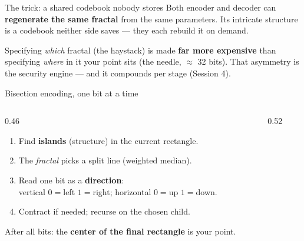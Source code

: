 \documentclass[aspectratio=169,11pt]{beamer}
\begin{document}
\begin{frame}{The trick: a shared codebook nobody stores}
  Both encoder and decoder can \textbf{regenerate the same fractal} from the same
  parameters. Its intricate structure is a codebook neither side saves --- they
  each rebuild it on demand.
  \vspace{6pt}
  \begin{keyidea}
    Specifying \emph{which} fractal (the haystack) is made \textbf{far more
    expensive} than specifying \emph{where} in it your point sits (the needle,
    $\approx$ 32 bits). That asymmetry is the security engine --- and it
    compounds per stage (Session 4).
  \end{keyidea}
\end{frame}

\begin{frame}{Bisection encoding, one bit at a time}
  \begin{columns}[T]
    \begin{column}{0.46\textwidth}
      \footnotesize
      \begin{enumerate}
        \item Find \textbf{islands} (structure) in the current rectangle.
        \item The \emph{fractal} picks a split line (weighted median).
        \item Read one bit as a \textbf{direction}: \\
          vertical $0{=}$left $1{=}$right; horizontal $0{=}$up $1{=}$down.
        \item Contract if needed; recurse on the chosen child.
      \end{enumerate}
      \vspace{2pt}
      After all bits: the \textbf{center of the final rectangle} is your point.
    \end{column}
    \begin{column}{0.52\textwidth}
      \centering
    \end{column}
  \end{columns}
\end{frame}
\end{document}
